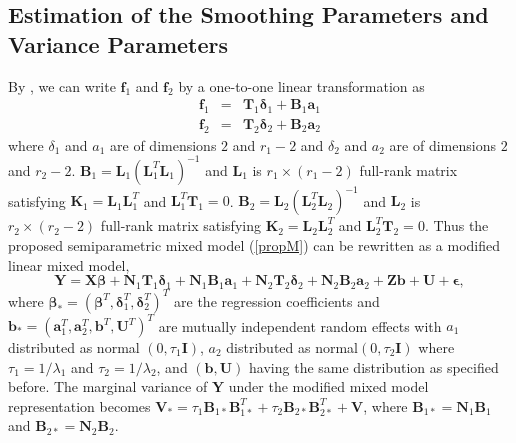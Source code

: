 \documentclass[12pt, notitlepage]{article}
\begin{document}
\subsection{Estimation of the Smoothing Parameters and Variance Parameters} \label{estSmoo}

By \cite{Green:1987}, we can write $\boldsymbol f_1$ and $\boldsymbol f_2$ by a one-to-one linear transformation as 
\begin{eqnarray*}
\boldsymbol f_1 &=& \boldsymbol T_1 \boldsymbol \delta_1 + \boldsymbol B_1 \boldsymbol a_1 \\
\boldsymbol f_2 &=& \boldsymbol T_2 \boldsymbol \delta_2 + \boldsymbol B_2 \boldsymbol a_2 
\end{eqnarray*}
where $\delta_1$ and $a_1$ are of dimensions $2$ and $r_1 - 2$ and $\delta_2$ and $a_2$ are of dimensions $2$ and $r_2 - 2$.  
$\boldsymbol B_1 = \boldsymbol L_1 (\boldsymbol L_1^T \boldsymbol L_1)^{-1}$ and $\boldsymbol L_1$ is $r_1 \times (r_1-2)$ full-rank matrix satisfying $\boldsymbol K_1 = \boldsymbol L_1 \boldsymbol L_1^T$ and 
$\boldsymbol L_1^T \boldsymbol T_1 = 0$. 
$\boldsymbol B_2 = \boldsymbol L_2 (\boldsymbol L_2^T \boldsymbol L_2)^{-1}$ and $\boldsymbol L_2$ is $r_2 \times (r_2-2)$ full-rank matrix satisfying $\boldsymbol K_2 = \boldsymbol L_2\boldsymbol L_2^T$ and 
$\boldsymbol L_2^T \boldsymbol T_2 = 0$. 
Thus the proposed semiparametric mixed model (\ref{propM}) can be rewritten as a modified linear mixed model, 
\begin{equation} \label{modLME}
\boldsymbol Y = \boldsymbol X \boldsymbol \beta 
+ \boldsymbol N_1 \boldsymbol T_1 \boldsymbol \delta_1 + \boldsymbol N_1 \boldsymbol B_1 \boldsymbol a_1
+ \boldsymbol N_2 \boldsymbol T_2 \boldsymbol \delta_2 + \boldsymbol N_2 \boldsymbol B_2 \boldsymbol a_2
+ \boldsymbol Z \boldsymbol b + \boldsymbol U + \boldsymbol \epsilon,
\end{equation}
where $\boldsymbol \beta_* = (\boldsymbol \beta^T, \boldsymbol \delta_1^T, \boldsymbol \delta_2^T)^T$ are the regression coefficients and 
$\boldsymbol b_* = (\boldsymbol a_1^T,  \boldsymbol a_2^T, \boldsymbol b^T, \boldsymbol U^T)^T$  are mutually independent random effects with $a_1$ distributed as normal
$(0, \tau_1 \boldsymbol I)$,
$a_2$ distributed as normal$(0, \tau_2 \boldsymbol I)$ where $\tau_1 = 1/\lambda_1$ and $\tau_2 = 1/\lambda_2$, and $(\boldsymbol b, \boldsymbol U)$ having the same distribution as specified before. 
The marginal variance of $\boldsymbol Y$ under the modified mixed model representation becomes 
$\boldsymbol V_* = \tau_1 \boldsymbol B_{1*} \boldsymbol B_{1*}^T +  \tau_2 \boldsymbol B_{2*} \boldsymbol B_{2*}^T + \boldsymbol V$, 
where 
$\boldsymbol B_{1*} = \boldsymbol N_1 \boldsymbol B_1$
and 
$\boldsymbol B_{2*} = \boldsymbol N_2 \boldsymbol B_2$.
\end{document}
